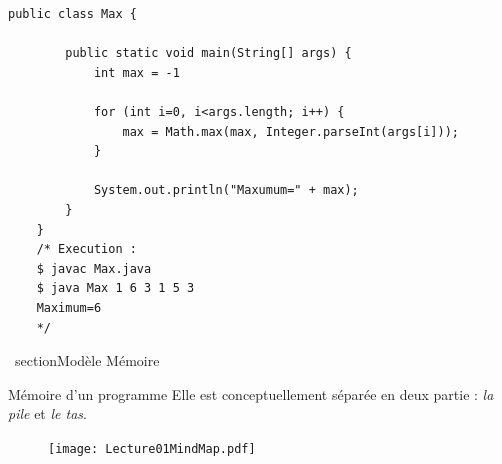 \documentclass{report}
\begin{document}
\begin{EExample*}{}{}
\begin{lstlisting}[style=JavaDraculaWhite]
	public class Max {

	    public static void main(String[] args) {
			int max = -1
			
			for (int i=0, i<args.length; i++) {
				max = Math.max(max, Integer.parseInt(args[i]));
			}

			System.out.println("Maxumum=" + max);
		}
	}
	/* Execution :
	$ javac Max.java
	$ java Max 1 6 3 1 5 3
	Maximum=6
	*/
\end{lstlisting}
\end{EExample*}
% 
\
section{Modèle Mémoire}
\begin{Concept*}{Mémoire d'un programme}
Elle est conceptuellement séparée en deux partie : \textit{la pile} et \textit{le tas}.
\end{Concept*}
\pagebreak
\begin{center}
\begin{figure}[H]
	\texttt{[image: Lecture01MindMap.pdf]}
\end{figure}
\end{center}
\end{document}
